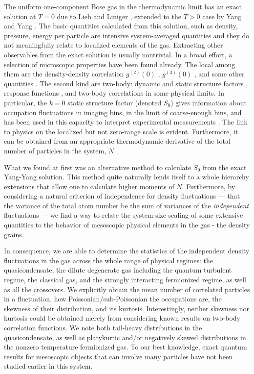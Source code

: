 \documentclass[aps,twocolumn,pra,superscriptaddress,nofootinbib,amsmath,amssymb,floats,floatfix,english]{revtex4-1}
\begin{document}
The uniform one-component Bose gas in the thermodynamic limit has an exact solution at $T=0$ due to Lieb and Liniger \cite{Lieb63,Lieb63b}, extended to the $T>0$ case by Yang and Yang \cite{Yang69}. The basic quantities calculated from this solution, such as density, pressure, energy per particle are intensive system-averaged quantities and they do not meaningfully relate to localized elements of the gas. Extracting other observables from the exact solution is usually nontrivial. In a broad effort, a selection of microscopic properties have been found already. The local among them are the  density-density correlation $g^{(2)}(0)$ \cite{Kheruntsyan03,Kheruntsyan05,Wang13}, 
$g^{(3)}(0)$ \cite{Cheianov06,Kormos11}, and some other quantities \cite{Kormos10,Piroli15,Nandani16}.
The second kind are two-body:  dynamic and static structure factors \cite{Panfil14,Panfil13,deNardis16}, response functions \cite{Cherny06},
and two-body correlations \cite{Sykes08,Deuar09,Golovach09,Kozlowski11,Kozlowski11b,Patu13,Klumper14,Nandani16} in some physical limits.
In particular, the $k=0$ static structure factor (denoted $S_0$) gives information about occupation fluctuations in imaging bins, in the limit of coarse-enough bins, and has been used in this capacity to interpret experimental measurements \cite{Esteve06,Sanner10,Muller10,Armijo10,Jacqmin11,Armijo11,Armijo12,Bisset13}.
The link to physics on the localized but not zero-range scale is evident. Furthermore, it can be obtained from an appropriate thermodynamic derivative of the total number of particles in the system, $N$ \cite{Armijo10}. 

What we found at first was an alternative method to calculate $S_0$  from the exact Yang-Yang solution. This method quite naturally lends itself to a whole hierarchy extensions that allow one to calculate higher moments of $N$.  
Furthermore, by considering a natural criterion of independence for density fluctuations --- that the variance of the total atom number be the sum of variances of the \emph{independent} fluctuations --- we find a way to relate the system-size scaling of some extensive quantities to the behavior of mesoscopic physical elements in the gas - the density grains. 

In consequence, we are able to determine the statistics of the independent density fluctuations in the gas across the whole range  of physical regimes: the quasicondensate, the dilute degenerate gas including the quantum turbulent regime, the classical gas, and the strongly interacting fermionized regime, as well as all the crossovers. 
We explicitly obtain the mean number of correlated particles in a fluctuation, how Poissonian/sub-Poissonian the occupations are, the skewness of their distribution, and its kurtosis. 
Interestingly, neither skewness nor kurtosis could be obtained merely from considering known results on two-body correlation functions. 
We note both tail-heavy distributions in the quasicondensate, as well as platykurtic and/or negatively skewed distributions in the nonzero temperature fermionized gas.
To our best knowledge, exact quantum results for mesoscopic objects that can involve many particles have not been studied earlier in this system.
\end{document}

